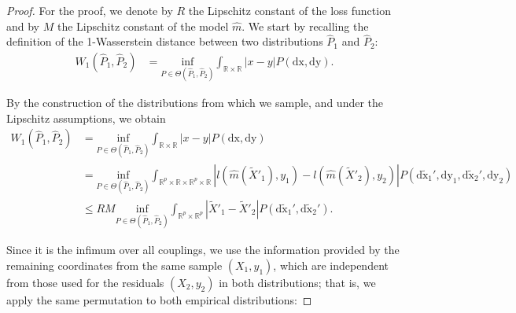 \documentclass{article}
\theoremstyle{plain}
\theoremstyle{definition}
\theoremstyle{remark}
\begin{document}
 \begin{proof}
For the proof, we denote by $R$ the Lipschitz constant of the loss function and by $M$ the Lipschitz constant of the model $\widehat{m}$.
We start by recalling the definition of the 1-Wasserstein distance between two distributions $\hat{P}_1$ and $\hat{P}_2$:
 \begin{align*}
     W_1(\hat{P}_1, \hat{P}_2) &=
        \underset{P \in \Theta(\hat{P}_1, \hat{P}_2)}{\mathrm{inf}}
        \int_{\mathbb{R} \times \mathbb{R}}
        |x-y| P(\mathrm{dx, dy}).
 \end{align*}
 
By the construction of the distributions from which we sample, and under the Lipschitz assumptions, we obtain
 \begin{align*}
     W_1(\hat{P}_1, \hat{P}_2) &= 
        \underset{P \in \Theta(\hat{P}_1, \hat{P}_2)}{\mathrm{inf}}
        \int_{\mathbb{R} \times \mathbb{R}} 
        |x-y| P(\mathrm{dx, dy})\\
        &= \underset{P \in \Theta(\hat{P}_1, \hat{P}_2)}{\mathrm{inf}}
        \int_{\mathbb{R}^p \times \mathbb{R}\times \mathbb{R}^p \times \mathbb{R}} 
        |l(\widehat{m}(\widetilde{X}'_1), y_1)-l(\widehat{m}(\widetilde{X}'_2), y_2)| P(\mathrm{d\widetilde{x}_1',dy_1,d\widetilde{x}_2',dy_2 })\\
        & \leq  RM\underset{P \in \Theta(\hat{P}_1, \hat{P}_2)}{\mathrm{inf}}
        \int_{\mathbb{R}^p \times \mathbb{R}^p} 
        |\widetilde{X}'_1-\widetilde{X}'_2| P(\mathrm{d\widetilde{x}_1',d\widetilde{x}_2'}).
 \end{align*}

 
Since it is the infimum over all couplings, we use the information provided by the remaining coordinates from the same sample $(X_1, y_1)$, which are independent from those used for the residuals $(X_2, y_2)$ in both distributions; that is, we apply the same permutation to both empirical distributions:


\end{proof}
\end{document}
